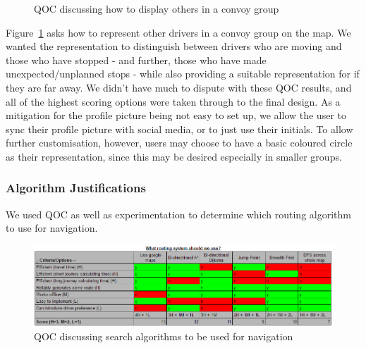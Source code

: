 \documentclass{article}
\begin{document}
\begin{figure}[H]
  \centering
  \caption{QOC discussing how to display others in a convoy group}\label{qoc-convoy}
\end{figure}

Figure~\ref{qoc-convoy} asks how to represent other drivers in a convoy group on the map. We wanted the representation to distinguish between drivers who are moving and those who have stopped - and further, those who have made unexpected/unplanned stops - while also providing a suitable representation for if they are far away. We didn't have much to dispute with these QOC results, and all of the highest scoring options were taken through to the final design. As a mitigation for the profile picture being not easy to set up, we allow the user to sync their profile picture with social media, or to just use their initials. To allow further customisation, however, users may choose to have a basic coloured circle as their representation, since this may be desired especially in smaller groups.

\subsubsection{Algorithm Justifications}\label{sssec:nav-design-alg}
We used QOC as well as experimentation to determine which routing algorithm to use for navigation.

\begin{figure}[H]
  \centering
  \includegraphics[width=\linewidth]{qoc-nav-routing}
  \caption{QOC discussing search algorithms to be used for navigation}\label{qoc-nav-routing}
\end{figure}
\end{document}
